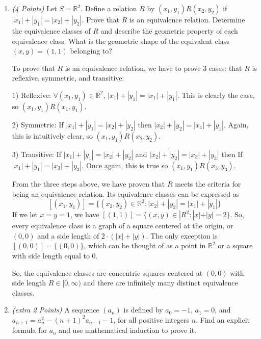 \documentclass[10pt]{article} %
\newcommand{\R}{\mathbb{R}}
\newcommand{\points}[1]{{\it (#1 Points)}}
\begin{document}
\begin{enumerate}
\begin{enumerate}
\end{enumerate}

\item \points{4} Let $S=\R^2$. Define a relation $R$ by $(x_1,y_1) R (x_2,y_2)$ if $|x_1|+|y_1|=|x_2|+|y_2|$.
Prove that $R$ is an equivalence relation. Determine the  equivalence classes of $R$ and describe
the geometric property of each equivalence class. What is the geometric shape of the equivalent class $(x,y)=(1,1)$ belonging to?

\bigskip

 To prove that $R$ is an equivalence relation, we have to prove 3 cases: that $R$ is reflexive, symmetric, and transitive:

1) Reflexive: $\forall(x_1,y_1)\in\R^2$, $|x_1|+|y_1| = |x_1|+|y_1|$.  This is clearly the case, so $(x_1,y_1)R(x_1,y_1)$.  

2) Symmetric: If $|x_1|+|y_1|=|x_2|+|y_2|$ then $|x_2|+|y_2|=|x_1|+|y_1|$.  Again, this is intuitively clear, so $(x_1,y_1)R(x_2,y_2)$.  

3) Transitive: If $|x_1|+|y_1|=|x_2|+|y_2|$ and $|x_2|+|y_2|=|x_3|+|y_3|$ then If $|x_1|+|y_1|=|x_3|+|y_3|$.  Once again, this is true so $(x_1,y_1)R(x_3,y_3)$.  

From the three steps above, we have proven that $R$ meets the criteria for being an equivalence relation.  Its equivalence classes can be expressed as $$[(x_1,y_1)]=\{(x_2,y_2)\in\R^2:|x_2|+|y_2|=|x_1|+|y_1|\}$$
If we let $x=y=1$, we have $[(1,1)]=\{(x,y)\in|R^2:|x|+|y|=2\}$.  So, every equivalence class is a graph of a square centered at the origin, or $(0,0)$ and a side length of $2 \cdot (|x|+|y|)$.  The only exception is $[(0,0)]=\{(0,0)\}$, which can be thought of as a point in $\R^2$ or a square with side length equal to $0$.  

So, the equivalence classes are concentric squares centered at $(0,0)$ with side length $R\in[0,\infty)$ and there are infinitely many distinct equivalence classes.  




\item \points{extra 2} A sequence $(a_n)$ is defined by $a_0 = -1$, $a_1 = 0$, and $a_{n+1} = a^2_n-(n+1)^2a_{n-1}-1$, for all positive integers $n$. Find an explicit formula for $a_n$ and use mathematical induction to prove it.


\end{enumerate}
\end{document}
